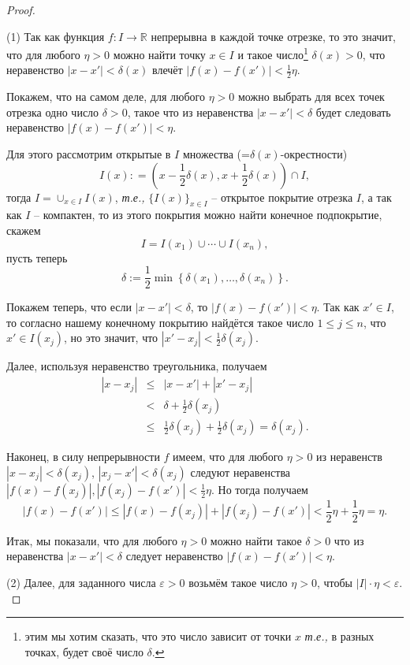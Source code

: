 \begin{proof}~

(1)  Так как функция $f:I \to \mathbb{R}$ непрерывна в каждой точке отрезке, то это значит, что для любого $\eta>0$ можно найти точку $x \in I$ и такое число\footnote{этим мы хотим сказать, что это число зависит от точки $x$ \textit{т.е.,} в разных точках, будет своё число $\delta$.} $\delta(x) >0$, что неравенство $|x - x'|< \delta(x)$ влечёт $|f(x) - f(x')|<\frac{1}{2}\eta.$

Покажем, что на самом деле, для любого $\eta>0$ можно выбрать для всех точек отрезка одно число $\delta>0$, такое что из неравенства $|x-x'| < \delta$ будет следовать неравенство $|f(x) - f(x')| < \eta.$ 

Для этого рассмотрим открытые в $I$ множества (=$\delta(x)$-окрестности)
\[
 I(x): = \left(x-\frac{1}{2}\delta(x), x + \frac{1}{2}\delta(x) \right) \cap I,
\]
тогда $I = \cup_{x\in I}I(x)$, \textit{т.е.,} $\{I(x)\}_{x\in I}$ -- открытое покрытие отрезка $I$, а так как $I$ -- компактен, то из этого покрытия можно найти конечное подпокрытие, скажем 
\[
 I = I(x_1) \cup \cdots \cup I(x_n),
\]
пусть теперь
\[
 \delta:=\frac{1}{2}\min \left\{ \delta(x_1),\ldots, \delta(x_n)  \right\}.
\]

Покажем теперь, что если $|x-x'| < \delta$, то $|f(x)- f(x')| < \eta$. Так как $x' \in I$, то согласно нашему конечному покрытию найдётся такое число $1 \le j \le n$, что $x ' \in I(x_j)$, но это значит, что $|x'-x_j| < \frac{1}{2}\delta(x_j)$.

Далее, используя неравенство треугольника, получаем
\begin{eqnarray*}
    |x-x_j| &\le& |x-x'| + |x'-x_j| \\
       &<& \delta + \frac{1}{2}\delta(x_j) \\
       &\le & \frac{1}{2}\delta(x_j) + \frac{1}{2}\delta(x_j)  =\delta(x_j).
\end{eqnarray*}

Наконец, в силу непрерывности $f$ имеем, что для любого $\eta>0$ из неравенств $|x-x_j| < \delta(x_j)$, $|x_j - x'| < \delta(x_j)$ следуют неравенства $|f(x)-f(x_j)|, |f(x_j) - f(x')|<\frac{1}{2}\eta$. Но тогда получаем
\[
 |f(x) - f(x')| \le |f(x)- f(x_j)| + |f(x_j) - f(x')| < \frac{1}{2} \eta + \frac{1}{2} \eta = \eta.
\]

Итак, мы показали, что для любого $\eta>0$ можно найти такое $\delta>0$ что из неравенства $|x-x'|<\delta$ следует неравенство $|f(x) - f(x')| < \eta.$


(2) Далее, для заданного числа $\varepsilon>0$ возьмём такое число $\eta>0$, чтобы $|I|\cdot \eta < \varepsilon.$ 


\end{proof}
